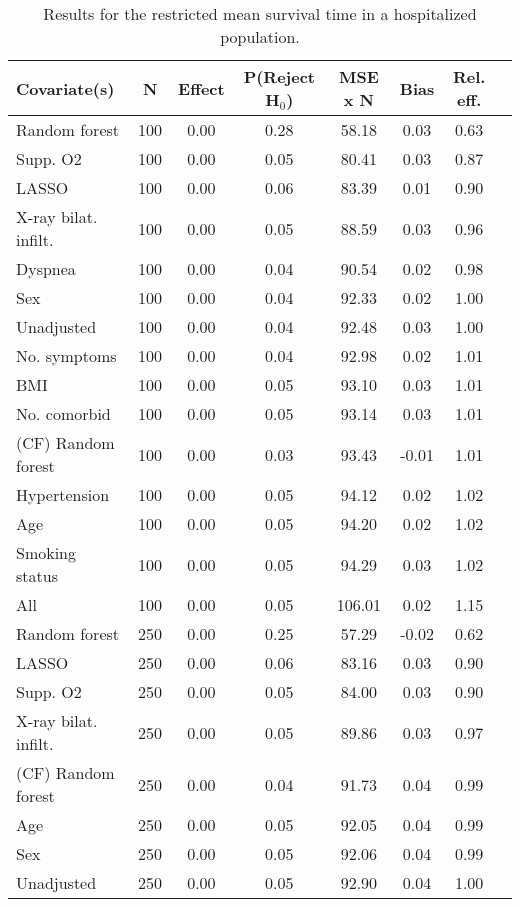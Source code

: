 \documentclass{article}
\begin{document}
{\tabcolsep=6pt  %
\begin{longtable}{lccccccc}
\caption{Results for the restricted mean survival time in a hospitalized population.} \\
Covariate(s) & N & Effect & P(Reject H$_0$) & MSE x N & Bias & Rel. eff.\\ \midrule
Random forest & 100 & 0.00 & 0.28 &  58.18 &  0.03 & 0.63 \\ 
Supp. O2 & 100 & 0.00 & 0.05 &  80.41 &  0.03 & 0.87 \\ 
LASSO & 100 & 0.00 & 0.06 &  83.39 &  0.01 & 0.90 \\ 
X-ray bilat. infilt. & 100 & 0.00 & 0.05 &  88.59 &  0.03 & 0.96 \\ 
Dyspnea & 100 & 0.00 & 0.04 &  90.54 &  0.02 & 0.98 \\ 
Sex & 100 & 0.00 & 0.04 &  92.33 &  0.02 & 1.00 \\ 
Unadjusted & 100 & 0.00 & 0.04 &  92.48 &  0.03 & 1.00 \\ 
No. symptoms & 100 & 0.00 & 0.04 &  92.98 &  0.02 & 1.01 \\ 
BMI & 100 & 0.00 & 0.05 &  93.10 &  0.03 & 1.01 \\ 
No. comorbid & 100 & 0.00 & 0.05 &  93.14 &  0.03 & 1.01 \\ 
(CF) Random forest & 100 & 0.00 & 0.03 &  93.43 & -0.01 & 1.01 \\ 
Hypertension & 100 & 0.00 & 0.05 &  94.12 &  0.02 & 1.02 \\ 
Age & 100 & 0.00 & 0.05 &  94.20 &  0.02 & 1.02 \\ 
Smoking status & 100 & 0.00 & 0.05 &  94.29 &  0.03 & 1.02 \\ 
All & 100 & 0.00 & 0.05 & 106.01 &  0.02 & 1.15 \\ \midrule() 
Random forest & 250 & 0.00 & 0.25 &  57.29 & -0.02 & 0.62 \\ 
LASSO & 250 & 0.00 & 0.06 &  83.16 &  0.03 & 0.90 \\ 
Supp. O2 & 250 & 0.00 & 0.05 &  84.00 &  0.03 & 0.90 \\ 
X-ray bilat. infilt. & 250 & 0.00 & 0.05 &  89.86 &  0.03 & 0.97 \\ 
(CF) Random forest & 250 & 0.00 & 0.04 &  91.73 &  0.04 & 0.99 \\ 
Age & 250 & 0.00 & 0.05 &  92.05 &  0.04 & 0.99 \\ 
Sex & 250 & 0.00 & 0.05 &  92.06 &  0.04 & 0.99 \\ 
Unadjusted & 250 & 0.00 & 0.05 &  92.90 &  0.04 & 1.00 \\ 

\end{longtable}}
\end{document}
